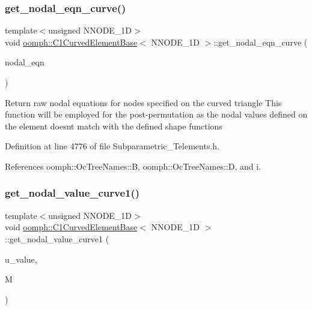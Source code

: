\subsubsection{\texorpdfstring{get\+\_\+nodal\+\_\+eqn\+\_\+curve()}{get\_nodal\_eqn\_curve()}}
{\footnotesize\ttfamily template$<$unsigned N\+N\+O\+D\+E\+\_\+1D$>$ \\
void \hyperlink{classoomph_1_1C1CurvedElementBase}{oomph\+::\+C1\+Curved\+Element\+Base}$<$ N\+N\+O\+D\+E\+\_\+1D $>$\+::get\+\_\+nodal\+\_\+eqn\+\_\+curve (\begin{DoxyParamCaption}\item[{\hyperlink{classoomph_1_1DenseMatrix}{Dense\+Matrix}$<$ int $>$ \&}]{nodal\+\_\+eqn }\end{DoxyParamCaption})\hspace{0.3cm}{\ttfamily [inline]}}

Return raw nodal equations for nodes specified on the curved triangle This function will be employed for the post-\/permutation as the nodal values defined on the element doesn\textquotesingle{}t match with the defined shape functions 

Definition at line 4776 of file Subparametric\+\_\+\+Telements.\+h.



References oomph\+::\+Oc\+Tree\+Names\+::B, oomph\+::\+Oc\+Tree\+Names\+::D, and i.

\mbox{\label{classoomph_1_1C1CurvedElementBase_ab7e659908f8da866873b8b0a46519c61}} 
\subsubsection{\texorpdfstring{get\+\_\+nodal\+\_\+value\+\_\+curve1()}{get\_nodal\_value\_curve1()}}
{\footnotesize\ttfamily template$<$unsigned N\+N\+O\+D\+E\+\_\+1D$>$ \\
void \hyperlink{classoomph_1_1C1CurvedElementBase}{oomph\+::\+C1\+Curved\+Element\+Base}$<$ N\+N\+O\+D\+E\+\_\+1D $>$\+::get\+\_\+nodal\+\_\+value\+\_\+curve1 (\begin{DoxyParamCaption}\item[{\hyperlink{classoomph_1_1Vector}{Vector}$<$ double $>$ \&}]{u\+\_\+value,  }\item[{\hyperlink{classoomph_1_1DenseMatrix}{Dense\+Matrix}$<$ double $>$ \&}]{M }\end{DoxyParamCaption})\hspace{0.3cm}{\ttfamily [inline]}}



